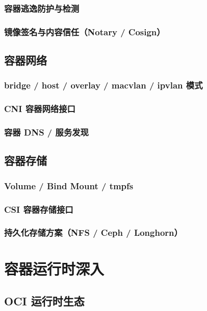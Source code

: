 \documentclass[12pt,UTF8]{ctexbook}
\begin{document}
    \subsection{容器逃逸防护与检测}
    \subsection{镜像签名与内容信任（Notary / Cosign）}

  \section{容器网络}
    \subsection{bridge / host / overlay / macvlan / ipvlan 模式}
    \subsection{CNI 容器网络接口}
    \subsection{容器 DNS / 服务发现}

  \section{容器存储}
    \subsection{Volume / Bind Mount / tmpfs}
    \subsection{CSI 容器存储接口}
    \subsection{持久化存储方案（NFS / Ceph / Longhorn）}


\chapter{容器运行时深入}
\label{chap:container-runtime}

  \section{OCI 运行时生态}
\end{document}
